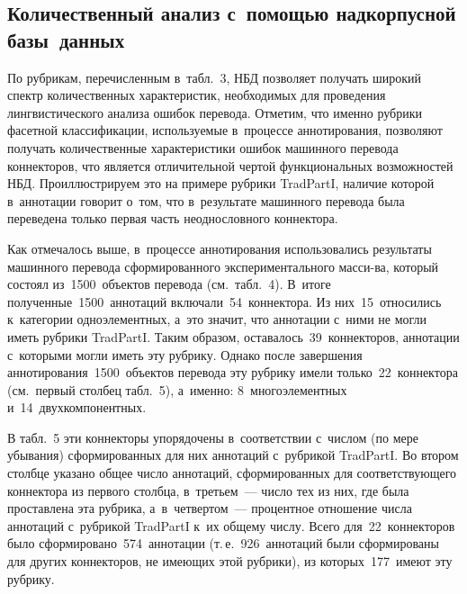 \begin{multicols}{2}
\vspace*{-9pt}

\section{Количественный анализ с~помощью надкорпусной базы~данных}
  
  По рубрикам, перечисленным в~табл.~3, НБД позволяет получать широкий 
спектр количественных характеристик, необходимых для проведения 
лингвистического анализа ошибок перевода. Отметим, что именно рубрики 
фасетной классификации, используемые в~процессе аннотирования, позволяют 
получать количественные характеристики ошибок машинного перевода 
коннекторов, что является отличительной чертой функциональных 
возможностей НБД. Проиллюстрируем это на примере рубрики TradPartI, 
наличие которой в~аннотации говорит о~том, что в~результате машинного 
перевода была переведена только первая часть неоднословного коннектора.
  
  Как отмечалось выше, в~процессе аннотирования использовались результаты 
машинного перевода сформированного экспериментального масси-\linebreak ва, который 
состоял из~1500~объектов перевода (см.\ табл.~4). В~итоге 
полученные~1500~аннотаций вклю\-ча\-ли~54~коннектора. Из 
них~15~относились к~категории одноэлементных, а~это значит, что аннотации 
с~ними не могли иметь рубрики TradPartI. Таким образом, 
оставалось~39~коннекторов, аннотации с~которыми могли иметь эту рубрику. 
Однако после завершения аннотирования~1500~объектов перевода эту рубрику 
имели только~22~коннектора (см.\ первый столбец табл.~5), 
а~именно: 8~многоэлементных и~14~двухкомпонентных.
  
  В табл.~5 эти коннекторы упорядочены в~соответствии с~числом (по мере 
убывания) сформированных для них аннотаций с~рубрикой TradPartI. Во 
втором столбце указано общее число аннотаций, сформированных для 
соответствующего коннектора из первого столбца, в~третьем~--- число тех из 
них, где была проставлена эта рубрика, а~в~чет\-вер\-том~--- процентное 
отношение числа аннотаций с~рубрикой TradPartI к~их общему числу. Всего 
для~22~коннекторов было сформировано~574~аннотации 
(т.\,е.~926~аннотаций были сформированы для других коннекторов, не 
имеющих этой рубрики), из которых~177~имеют эту рубрику.
  
  
  
  
 

\end{multicols}
